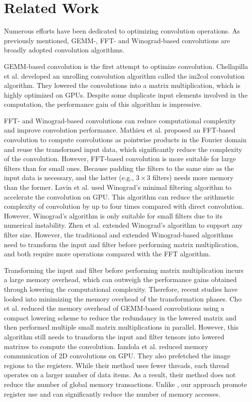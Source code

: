 \section{Related Work}
Numerous efforts have been dedicated to optimizing convolution operations. As previously mentioned, GEMM-, FFT- and
Winograd-based convolutions are broadly adopted convolution algorithms.

GEMM-based convolution is the first attempt to optimize convolution. Chellapilla et al. \cite{Chellapilla2006High} developed an unrolling
convolution algorithm  called the im2col convolution algorithm. They lowered the convolutions into a matrix multiplication, which is
highly optimized on GPUs. Despite some duplicate input elements involved in the computation, the performance gain of this algorithm is impressive.

FFT- and Winograd-based convolutions can reduce computational complexity and improve convolution performance. Mathieu et al.
\cite{mathieu2013fast} proposed an FFT-based convolution to compute convolutions as pointwise products in the Fourier domain and reuse the
transformed input data, which significantly reduce the complexity of the convolution. However, FFT-based convolution is more suitable for large filters than
for small ones. Because padding the filters to the same size as the input data is necessary, and  the latter (e.g., $3 \times 3$ filters) needs
more memory than the former. Lavin et al. \cite{lavin2016fast} used Winograd's minimal filtering algorithm to
accelerate the convolution on GPU. This algorithm can reduce the arithmetic complexity of convolution by up to four times compared with
direct convolution. However, Winograd's algorithm is only suitable for small filters due to its numerical instability.
Zhen et al. \cite{Zhen2018Optimizing} extended Winograd's algorithm to support any filter size. However, the traditional and extended Winograd-based
algorithms need to transform the input and filter before performing matrix multiplication, and both require more operations compared with
the FFT algorithm.

Transforming the input and filter before performing matrix multiplication incurs a large memory overhead, which can outweigh the
performance gains obtained through lowering the computational complexity. Therefore, recent studies have looked into minimizing the memory
overhead of the transformation phases. Cho et al. \cite{cho2017mec} reduced the memory overhead of GEMM-based convolutions using a compact
lowering scheme to reduce the redundancy in the lowered matrix and then performed multiple small matrix multiplications in parallel.
However, this algorithm still needs to transform the input and filter tensors into lowered matrixes to compute the convolution. Iandola et
al. \cite{Iandola2014Communication} reduced memory communication of 2D convolutions on GPU. They also prefetched the image regions to the
registers. While their method uses fewer threads, each thread operates on a larger number of data items. As a result, their method does not
reduce the number of global memory transactions. Unlike \cite{Iandola2014Communication}, our approach promote register use and can
significantly reduce the number of memory accesses.
